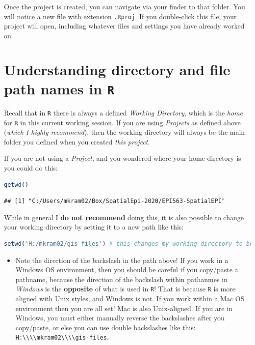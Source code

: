 \documentclass[
]{book}
\newcommand{\passthrough}[1]{#1}
\newenvironment{rmdblock}[1]
  {%
  \begin{itemize}
  \renewcommand{\labelitemi}{
    \raisebox{-.7\height}[0pt][0pt]{
      {\setkeys{Gin}{width=3em,keepaspectratio}\texttt{[image: images/\#1]}}
    }
  }
  \item
  }
  {
  \end{itemize}
  }
\newenvironment{rmdcaution}
  {\begin{rmdblock}{caution}}
  {\end{rmdblock}}
\begin{document}
Once the project is created, you can navigate via your finder to that folder. You will notice a new file with extension \passthrough{\lstinline!.Rproj!}. If you double-click this file, your project will open, including whatever files and settings you have already worked on.

\hypertarget{understanding-directory-and-file-path-names-in-r}{%
\section*{\texorpdfstring{Understanding directory and file path names in \texttt{R}}{Understanding directory and file path names in R}}\label{understanding-directory-and-file-path-names-in-r}}

Recall that in \passthrough{\lstinline!R!} there is always a defined \emph{Working Directory}, which is the \emph{home} for \passthrough{\lstinline!R!} in this current working session. If you are using \emph{Projects} as defined above (\emph{which I highly recommend}), then the working directory will always be the main folder you defined when you created \emph{this project}.

If you are not using a \emph{Project}, and you wondered where your home directory is you could do this:

\begin{lstlisting}[language=R]
getwd()
\end{lstlisting}

\begin{lstlisting}
## [1] "C:/Users/mkram02/Box/SpatialEpi-2020/EPI563-SpatialEPI"
\end{lstlisting}

While in general I \textbf{do not recommend} doing this, it is also possible to change your working directory by setting it to a new path like this:

\begin{lstlisting}[language=R]
setwd('H:/mkram02/gis-files') # this changes my working directory to be on the H:/ drive
\end{lstlisting}

\begin{rmdcaution}
Note the direction of the backslash in the path above! If you work in a Windows OS environment, then you should be careful if you copy/paste a pathname, because the direction of the backslash within pathanmes in \emph{Windows} is the \textbf{opposite} of what is used in \passthrough{\lstinline!R!}! That is because \passthrough{\lstinline!R!} is more aligned with Unix styles, and Windows is not. If you work within a Mac OS environment then you are all set! Mac is also Unix-aligned. If you are in Windows, you must either manually reverse the backslashes after you copy/paste, or else you can use double backslashes like this: \passthrough{\lstinline!H:\\\\mkram02\\\\gis-files!}.
\end{rmdcaution}
\end{document}

